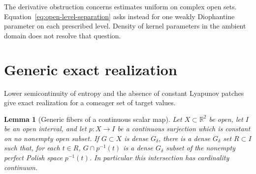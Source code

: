 \documentclass[11pt,letterpaper]{amsart}
\newtheorem{lemma}[theorem]{Lemma}
\theoremstyle{definition}
\theoremstyle{remark}
\numberwithin{equation}{section}
\begin{document}
The derivative obstruction concerns estimates uniform on complex open
sets. Equation~\eqref{eq:open-level-separation} asks instead for one
weakly Diophantine parameter on each prescribed level. Density of
kernel parameters in the ambient domain does not resolve that question.

\section{Generic exact realization}\label{sec:category}

Lower semicontinuity of entropy and the absence of constant Lyapunov
patches give exact realization for a comeager set of target values.

\begin{lemma}[Generic fibers of a continuous scalar map]
\label{lem:category-levels}
Let $X\subset\mathbb R^2$ be open, let $I$ be an open interval,
and let $p:X\to I$ be a continuous surjection which is constant
on no nonempty open subset. If $G\subset X$ is dense $G_\delta$,
there is a dense $G_\delta$ set $R\subset I$ such that, for each
$t\in R$, $G\cap p^{-1}(t)$ is a dense $G_\delta$ subset of the
nonempty perfect Polish space $p^{-1}(t)$. In particular this
intersection has cardinality continuum.
\end{lemma}
\end{document}
